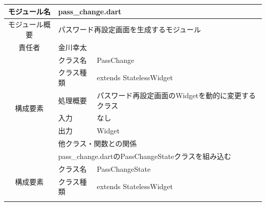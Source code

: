 \begin{table}[H]
  \centering
  \begin{tabular}{|c|l|l|} \hline
    モジュール名                & \multicolumn{2}{l|}{pass\_change.dart}                                                                                         \\ \hline
    モジュール概要               & \multicolumn{2}{p{12cm}|}{パスワード再設定画面を生成するモジュール}                                                                                \\ \hline
    責任者                   & \multicolumn{2}{l|}{金川幸太}                                                                                                      \\ \hline
    \multirow{7}{*}{構成要素} & クラス名                                                                 & PassChange                                              \\ \cline{2-3}
                          & クラス種類                                                                & extends StatelessWidget                                 \\ \cline{2-3}
                          & 処理概要                                                                 & \multicolumn{1}{p{12cm}|}{パスワード再設定画面のWidgetを動的に変更するクラス} \\ \cline{2-3}
                          & 入力                                                                   & なし                                                      \\ \cline{2-3}
                          & 出力                                                                   & Widget                                                  \\ \cline{2-3}
                          & \multicolumn{2}{l|}{他クラス・関数との関係}                                                                                               \\ \cline{2-3}
                          & \multicolumn{2}{p{14cm}|}{pass\_change.dartのPassChangeStateクラスを組み込む}                                                           \\ \hline
    \multirow{7}{*}{構成要素} & クラス名                                                                 & PassChangeState                                         \\ \cline{2-3}
                          & クラス種類                                                                & extends StatelessWidget                                 \\ \cline{2-3}

\end{tabular}
\end{table}
